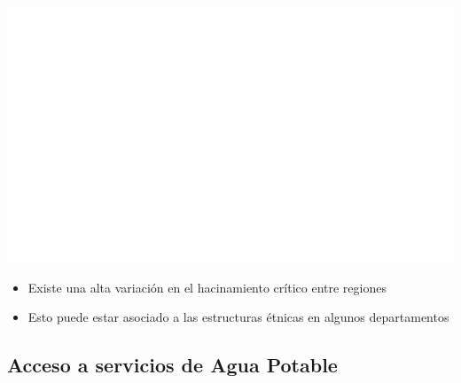 \documentclass[aspectratio=169]{beamer}
\begin{document}
    \begin{slide}{6} 
                      \begin{imagecolumn}
                \includegraphics[width=\columnwidth]{img/var_265_map.png}
            \end{imagecolumn}
            \begin{textcolumn}
                \begin{itemize}
                    \item Existe una alta variación en el hacinamiento crítico entre regiones 
                    \item Esto puede estar asociado a las estructuras étnicas en algunos departamentos
                \end{itemize}
            \end{textcolumn}

    \printcolumns
    \end{slide}
    
    
        
    \subsection{Acceso a servicios de Agua Potable}
    
\end{document}
